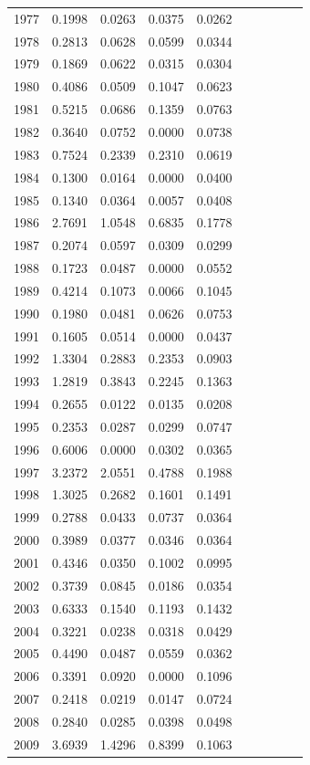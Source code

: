 \begin{table}
\begin{tabular}{cccccccccc}
1977& 0.1998& 0.0263& 0.0375& 0.0262\\ 
1978& 0.2813& 0.0628& 0.0599& 0.0344\\ 
1979& 0.1869& 0.0622& 0.0315& 0.0304\\ 
1980& 0.4086& 0.0509& 0.1047& 0.0623\\ 
1981& 0.5215& 0.0686& 0.1359& 0.0763\\ 
1982& 0.3640& 0.0752& 0.0000& 0.0738\\ 
1983& 0.7524& 0.2339& 0.2310& 0.0619\\ 
1984& 0.1300& 0.0164& 0.0000& 0.0400\\ 
1985& 0.1340& 0.0364& 0.0057& 0.0408\\ 
1986& 2.7691& 1.0548& 0.6835& 0.1778\\ 
1987& 0.2074& 0.0597& 0.0309& 0.0299\\ 
1988& 0.1723& 0.0487& 0.0000& 0.0552\\ 
1989& 0.4214& 0.1073& 0.0066& 0.1045\\ 
1990& 0.1980& 0.0481& 0.0626& 0.0753\\ 
1991& 0.1605& 0.0514& 0.0000& 0.0437\\ 
1992& 1.3304& 0.2883& 0.2353& 0.0903\\ 
1993& 1.2819& 0.3843& 0.2245& 0.1363\\ 
1994& 0.2655& 0.0122& 0.0135& 0.0208\\ 
1995& 0.2353& 0.0287& 0.0299& 0.0747\\ 
1996& 0.6006& 0.0000& 0.0302& 0.0365\\ 
1997& 3.2372& 2.0551& 0.4788& 0.1988\\ 
1998& 1.3025& 0.2682& 0.1601& 0.1491\\ 
1999& 0.2788& 0.0433& 0.0737& 0.0364\\ 
2000& 0.3989& 0.0377& 0.0346& 0.0364\\ 
2001& 0.4346& 0.0350& 0.1002& 0.0995\\ 
2002& 0.3739& 0.0845& 0.0186& 0.0354\\ 
2003& 0.6333& 0.1540& 0.1193& 0.1432\\ 
2004& 0.3221& 0.0238& 0.0318& 0.0429\\ 
2005& 0.4490& 0.0487& 0.0559& 0.0362\\ 
2006& 0.3391& 0.0920& 0.0000& 0.1096\\ 
2007& 0.2418& 0.0219& 0.0147& 0.0724\\ 
2008& 0.2840& 0.0285& 0.0398& 0.0498\\ 
2009& 3.6939& 1.4296& 0.8399& 0.1063\\ 

\end{tabular}
\end{table}
